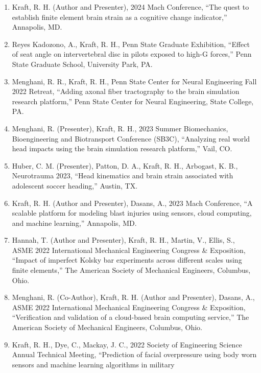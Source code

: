 \documentclass[11pt]{article}
\begin{document}
\begin{enumerate}
\def\labelenumi{\arabic{enumi}.}
\item
  Kraft, R. 
H. 
(Author and Presenter), 2024 Mach Conference, ``The quest
  to establish finite element brain strain as a cognitive change
  indicator,'' Annapolis, MD.
\item
  Reyes Kadozono, A., Kraft, R. 
H., Penn State Graduate Exhibition,
  ``Effect of seat angle on intervertebral disc in pilots exposed to
  high-G forces,'' Penn State Graduate School, University Park, PA.
\item
  Menghani, R. 
R., Kraft, R. 
H., Penn State Center for Neural
  Engineering Fall 2022 Retreat, ``Adding axonal fiber tractography to
  the brain simulation research platform\hspace{0pt},'' Penn State Center
  for Neural Engineering, State College, PA.
\item
  Menghani, R. 
(Presenter), Kraft, R. 
H., 2023 Summer Biomechanics,
  Bioengineering and Biotransport Conference (SB3C), ``Analyzing real
  world head impacts using the brain simulation research platform,''
  Vail, CO.
\item
  Huber, C. 
M. 
(Presenter), Patton, D. 
A., Kraft, R. 
H., Arbogast, K.
  B., Neurotrauma 2023, ``Head kinematics and brain strain associated
  with adolescent soccer heading,'' Austin, TX.
\item
  Kraft, R. 
H. 
(Author and Presenter), Dasans, A., 2023 Mach Conference,
  ``A scalable platform for modeling blast injuries using sensors, cloud
  computing, and machine learning,'' Annapolis, MD.
\item
  Hannah, T. 
(Author and Presenter), Kraft, R. 
H., Martin, V., Ellis,
  S., ASME 2022 International Mechanical Engineering Congress \&
  Exposition, ``Impact of imperfect Kolsky bar experiments across
  different scales using finite elements,'' The American Society of
  Mechanical Engineers, Columbus, Ohio.
\item
  Menghani, R. 
(Co-Author), Kraft, R. 
H. 
(Author and Presenter), Dasans,
  A., ASME 2022 International Mechanical Engineering Congress \&
  Exposition, ``Verification and validation of a cloud-based brain
  computing service,'' The American Society of Mechanical Engineers,
  Columbus, Ohio.
\item
  Kraft, R. 
H., Dye, C., Mackay, J. 
C., 2022 Society of Engineering
  Science Annual Technical Meeting, ``Prediction of facial overpressure
  using body worn sensors and machine learning algorithms in military

\end{enumerate}
\end{document}
